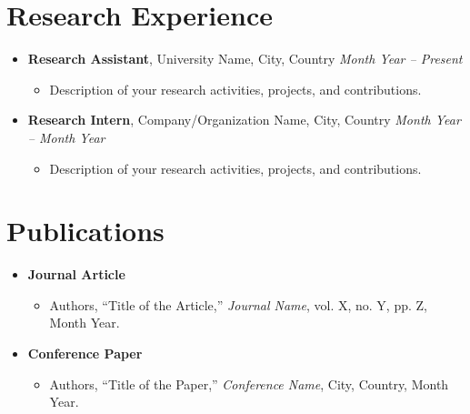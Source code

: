 \documentclass[letterpaper,10pt]{article}
\begin{document}

\section*{Research Experience}

\begin{itemize}[leftmargin=*]

\item \textbf{Research Assistant}, University Name, City, Country \hfill \textit{Month Year -- Present}
    \begin{itemize}
        \item Description of your research activities, projects, and contributions.
    \end{itemize}

\item \textbf{Research Intern}, Company/Organization Name, City, Country \hfill \textit{Month Year -- Month Year}
    \begin{itemize}
        \item Description of your research activities, projects, and contributions.
    \end{itemize}

\end{itemize}


\section*{Publications}

\begin{itemize}[leftmargin=*]

\item \textbf{Journal Article}
    \begin{itemize}
        \item Authors, ``Title of the Article,'' \textit{Journal Name}, vol. X, no. Y, pp. Z, Month Year.
    \end{itemize}

\item \textbf{Conference Paper}
    \begin{itemize}
        \item Authors, ``Title of the Paper,'' \textit{Conference Name}, City, Country, Month Year.
    \end{itemize}

\end{itemize}
\end{document}
